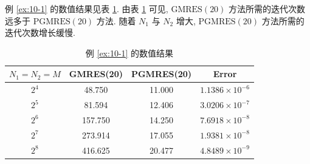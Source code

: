 \begingroup
\raggedbottom
{}
例 \ref{ex:10-1} 的数值结果见表 \ref{tab:10-1}. 由表 \ref{tab:10-1} 可见, $\mathrm{GMRES}(20)$ 方法所需的迭代次数远多于 $\mathrm{PGMRES}(20)$ 方法. 随着 $N_{1}$ 与 $N_{2}$ 增大, $\mathrm{PGMRES}(20)$ 方法所需的迭代次数增长缓慢.

\begin{table}[htbp]
  \centering
  \caption{例 \ref{ex:10-1} 的数值结果}
  \label{tab:10-1}
  \begin{tabular}{cccc}
    \toprule
    $N_{1}=N_{2}=M$ & GMRES(20) & PGMRES(20) & Error \\
    \midrule
    $2^{4}$ & 48.750  & 11.000 & $1.1386\times10^{-6}$ \\
    $2^{5}$ & 81.594  & 12.406 & $3.0206\times10^{-7}$ \\
    $2^{6}$ & 157.750 & 14.250 & $7.6918\times10^{-8}$ \\
    $2^{7}$ & 273.914 & 17.055 & $1.9381\times10^{-8}$ \\
    $2^{8}$ & 416.625 & 20.477 & $4.8489\times10^{-9}$ \\
    \bottomrule
  \end{tabular}
\end{table}
\clearpage
\endgroup
